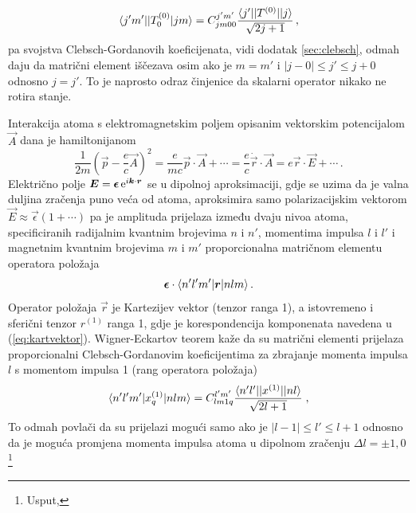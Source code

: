 \begin{primjer}
\begin{displaymath}
\langle j'm' ||T^{(0)}_0| jm \rangle = C^{j'm'}_{jm00}
\frac{\langle j' ||T^{(0)}|| j \rangle}{\sqrt{2j+1}} \,,
\end{displaymath}
pa svojstva Clebsch-Gordanovih koeficijenata, vidi dodatak \ref{sec:clebsch},
odmah daju da matrični element iščezava osim ako je $m=m'$ i
$|j-0|\leq j' \leq j+0$ odnosno $j=j'$. To je naprosto odraz
činjenice da skalarni operator nikako ne rotira stanje.
\end{primjer}


\begin{primjer}
Interakcija atoma s elektromagnetskim poljem opisanim vektorskim
potencijalom $\vec{A}$ dana je hamiltonijanom
\begin{equation}
    \frac{1}{2m}\left(\vec{p} - \frac{e}{c}\vec{A}\right)^2
    = \frac{e}{mc} \vec{p}\cdot\vec{A} + \cdots
    = \frac{e}{c} \dot{\vec{r}} \cdot \vec{A}
    = e \vec{r} \cdot \vec{E} + \cdots \,.
\end{equation}
Električno polje $\vec{E} = \vec{\epsilon}\, \rme^{i \vec{k}\cdot\vec{r}}$ se 
u dipolnoj aproksimaciji, gdje se uzima da je valna duljina zračenja puno
veća od atoma, aproksimira samo polarizacijskim vektorom 
$\vec{E}\approx\vec{\epsilon}(1+\cdots)$
pa je amplituda prijelaza između dvaju nivoa atoma, specificiranih
radijalnim kvantnim brojevima $n$ i $n'$, momentima impulsa
$l$ i $l'$ i magnetnim kvantnim brojevima $m$ i $m'$ proporcionalna
matričnom elementu operatora položaja
\begin{equation}
    \vec{\epsilon} \cdot \bra{n'l'm'}\vec{r}\ket{nlm}  \,.
\end{equation}
Operator položaja $\vec{r}$ je Kartezijev vektor (tenzor
ranga 1), a istovremeno i sferični tenzor $r^{(1)}$ ranga 1, gdje
je korespondencija komponenata navedena u (\ref{eq:kartvektor}).
Wigner-Eckartov teorem kaže da su matrični elementi prijelaza
proporcionalni Clebsch-Gordanovim koeficijentima za zbrajanje
momenta impulsa $l$ s momentom impulsa 1 (rang operatora položaja)
\begin{displaymath}
 \langle n'l'm' |x^{(1)}_q | nlm \rangle = C^{l'm'}_{lm1q}
\frac{\langle n'l' ||x^{(1)}|| nl \rangle}{\sqrt{2l+1}} \;,
\end{displaymath}
To odmah povlači da su prijelazi mogući samo ako
je $|l-1|\leq l' \leq l+1$ odnosno da je moguća promjena
momenta impulsa atoma u dipolnom zračenju $\Delta l = \pm 1,0$\footnote{Usput,
}
\end{primjer}
